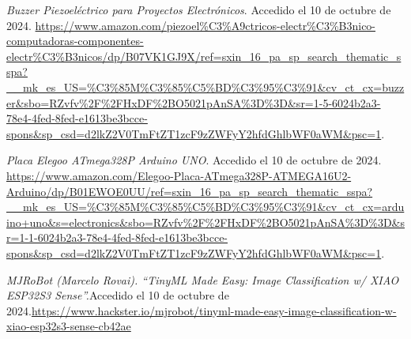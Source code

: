 \begin{thebibliography}{99}
    \textit{Buzzer Piezoeléctrico para Proyectos Electrónicos}. Accedido el 10 de octubre de 2024. \url{https://www.amazon.com/piezoel%C3%A9ctricos-electr%C3%B3nico-computadoras-componentes-electr%C3%B3nicos/dp/B07VK1GJ9X/ref=sxin_16_pa_sp_search_thematic_sspa?__mk_es_US=%C3%85M%C3%85%C5%BD%C3%95%C3%91&cv_ct_cx=buzzer&sbo=RZvfv%2F%2FHxDF%2BO5021pAnSA%3D%3D&sr=1-5-6024b2a3-78e4-4fed-8fed-e1613be3bcce-spons&sp_csd=d2lkZ2V0TmFtZT1zcF9zZWFyY2hfdGhlbWF0aWM&psc=1}.

    \textit{Placa Elegoo ATmega328P Arduino UNO}. Accedido el 10 de octubre de 2024. \url{https://www.amazon.com/Elegoo-Placa-ATmega328P-ATMEGA16U2-Arduino/dp/B01EWOE0UU/ref=sxin_16_pa_sp_search_thematic_sspa?__mk_es_US=%C3%85M%C3%85%C5%BD%C3%95%C3%91&cv_ct_cx=arduino+uno&s=electronics&sbo=RZvfv%2F%2FHxDF%2BO5021pAnSA%3D%3D&sr=1-1-6024b2a3-78e4-4fed-8fed-e1613be3bcce-spons&sp_csd=d2lkZ2V0TmFtZT1zcF9zZWFyY2hfdGhlbWF0aWM&psc=1}.

    \textit{MJRoBot (Marcelo Rovai). “TinyML Made Easy: Image Classification w/ XIAO ESP32S3 Sense”.}Accedido el 10 de octubre de 2024.\url{https://www.hackster.io/mjrobot/tinyml-made-easy-image-classification-w-xiao-esp32s3-sense-cb42ae}
    
\end{thebibliography}
